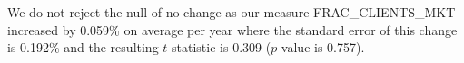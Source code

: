We do not reject the null of no change as our measure FRAC\_CLIENTS\_MKT increased by 0.059\% on average per year where the standard error of this change is 0.192\% and the resulting $t$-statistic is 0.309 ($p$-value is 0.757).